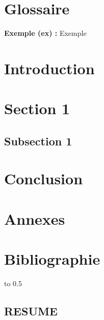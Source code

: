 \documentclass[12pt]{article}
\begin{document}
\section*{Glossaire}

\textbf{Exemple (ex) :} Exemple\\

\newpage 

\section*{Introduction}

\newpage

\section{Section 1}
\subsection{Subsection 1}

\newpage

\section{Conclusion}

\newpage

\section*{Annexes}

\newpage

\begingroup
\setlength{\parindent}{0pt}  %

\section*{Bibliographie}

\endgroup  %

\newpage


\centerline{\hbox to 0.5\textwidth{\hrulefill}}

\begin{center}

\section*{RESUME}

\end{center}
\end{document}
